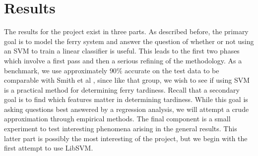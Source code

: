 \documentclass[11pt]{article} %
\begin{document}
% 
% 
% 
% 

% 
% 

\section{Results}
\label{sec:results}
The results for the project exist in three parts. As described before, the primary
goal is to model the ferry system and answer the question of whether or not using
an SVM to train a linear classifier is useful. This leads to the first two phases
which involve a first pass and then a serious refining of the methodology. As a 
benchmark, we use approximately $90\%$ accurate on the test data to be comparable
with Smith et al \cite{smith2008decision}, since like that group, we wish to see
if using SVM is a practical method for determining ferry tardiness. Recall that
a secondary goal is to find which features matter in determining tardiness.  While
this goal is asking questions best answered by a regression analysis, we will 
attempt a crude approximation through empirical methods.  The final component is 
a small experiment to test interesting phenomena arising in the general results.  
This latter part is possibly the most interesting of the project, but we begin 
with the first attempt to use LibSVM.
\end{document}

